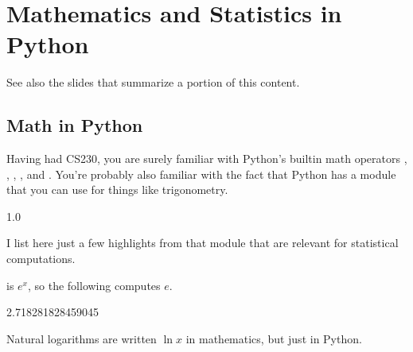 \documentclass[letterpaper,10pt,english]{sphinxmanual}
\begin{document}
\chapter{Mathematics and Statistics in Python}
\label{\detokenize{chapter-9-math-and-stats:mathematics-and-statistics-in-python}}\label{\detokenize{chapter-9-math-and-stats::doc}}
See also the slides that summarize a portion of this content.


\section{Math in Python}
\label{\detokenize{chapter-9-math-and-stats:math-in-python}}
Having had CS230, you are surely familiar with Python’s built\sphinxhyphen{}in math operators \sphinxcode{\sphinxupquote{+}}, \sphinxcode{\sphinxupquote{\sphinxhyphen{}}}, \sphinxcode{\sphinxupquote{*}}, \sphinxcode{\sphinxupquote{/}}, and \sphinxcode{\sphinxupquote{**}}.  You’re probably also familiar with the fact that Python has a  module that you can use for things like trigonometry.

\begin{sphinxVerbatim}[commandchars=\\\{\}]
 
  
\end{sphinxVerbatim}

\begin{sphinxVerbatim}[commandchars=\\\{\}]
1.0
\end{sphinxVerbatim}

I list here just a few highlights from that module that are relevant for statistical computations.

 is \(e^x\), so the following computes \(e\).

\begin{sphinxVerbatim}[commandchars=\\\{\}]
  
\end{sphinxVerbatim}

\begin{sphinxVerbatim}[commandchars=\\\{\}]
2.718281828459045
\end{sphinxVerbatim}

Natural logarithms are written \(\ln x\) in mathematics, but just  in Python.
\end{document}
